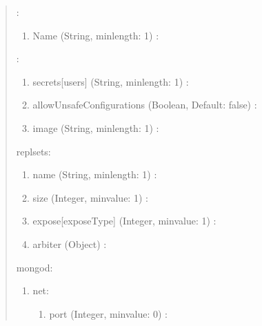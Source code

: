 \documentclass[letterpaper,10pt,english]{sphinxmanual}
\begin{document}
\begin{quote}

:
\begin{enumerate}
%
\item {} 
Name (String, min\sphinxhyphen{}length: 1) : 

\end{enumerate}

:
\begin{enumerate}
%
\item {} 
secrets{[}users{]} (String, min\sphinxhyphen{}length: 1) : 

\item {} 
allowUnsafeConfigurations (Boolean, Default: false) : 

\item {} 
image (String, min\sphinxhyphen{}length: 1) : 

\end{enumerate}

replsets:
\begin{enumerate}
%
\item {} 
name (String, min\sphinxhyphen{}length: 1) : 

\item {} 
size (Integer, min\sphinxhyphen{}value: 1) : 

\item {} 
expose{[}exposeType{]} (Integer, min\sphinxhyphen{}value: 1) : 

\item {} 
arbiter (Object) : 

\end{enumerate}

mongod:
\begin{enumerate}
%
\item {} 
net:
\begin{enumerate}
%
\item {} 
port (Integer, min\sphinxhyphen{}value: 0) : 


\end{enumerate}
\end{enumerate}
\end{quote}
\end{document}
